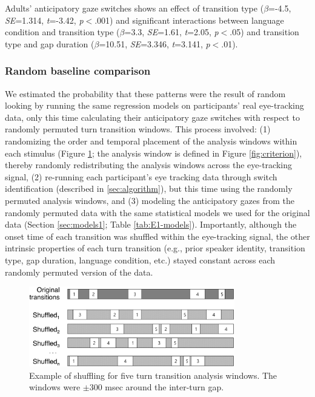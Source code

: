 \documentclass[authoryear, 12pt]{elsarticle}
\begin{document}
Adults' anticipatory gaze switches shows an effect of transition type (\textit{$\beta$}=-4.5, \textit{SE}=1.314, \textit{t}=-3.42, \textit{p}$<$.001) and significant interactions between language condition and transition type (\textit{$\beta$}=3.3, \textit{SE}=1.61, \textit{t}=2.05, \textit{p}$<$.05) and transition type and gap duration (\textit{$\beta$}=10.51, \textit{SE}=3.346, \textit{t}=3.141, \textit{p}$<$.01).

\subsubsection{Random baseline comparison}
\label{sec:randbaseline1}

We estimated the probability that these patterns were the result of random looking by running the same regression models on participants' real eye-tracking data, only this time calculating their anticipatory gaze switches with respect to randomly permuted turn transition windows. This process involved: (1) randomizing the order and temporal placement of the analysis windows within each stimulus (Figure \ref{fig:shuffling}; the analysis window is defined in Figure \ref{fig:criterion}), thereby randomly redistributing the analysis windows across the eye-tracking signal, (2) re-running each participant's eye tracking data through switch identification (described in \ref{sec:algorithm}), but this time using the randomly permuted analysis windows, and (3) modeling the anticipatory gazes from the randomly permuted data with the same statistical models we used for the original data (Section \ref{sec:models1}; Table \ref{tab:E1-models}). Importantly, although the onset time of each transition was shuffled within the eye-tracking signal, the other intrinsic properties of each turn transition (e.g., prior speaker identity, transition type, gap duration, language condition, etc.) stayed constant across each randomly permuted version of the data. 

\begin{figure}[ht!]
\begin{center}
\includegraphics[width=0.8\textwidth]{figures/FIG-ShuffledWindows.png}
\end{center}
\caption{Example of shuffling for five turn transition analysis windows. The windows were $\pm$300 msec around the inter-turn gap.} 
\label{fig:shuffling}
\end{figure}
\end{document}
